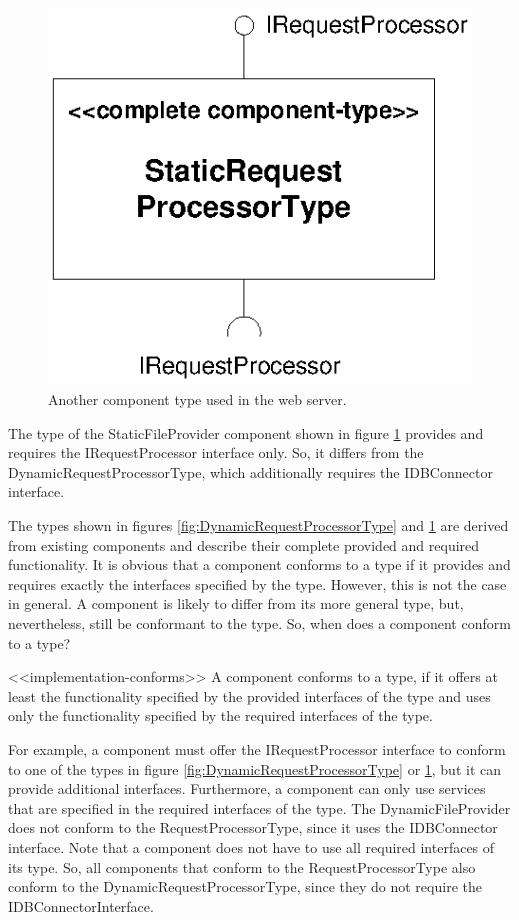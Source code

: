 \begin{figure}[htbp]
\centering
\includegraphics[scale=0.85]{example/RequestProcessorType}
\caption{Another component type used in the web server.}
\label{fig:RequestProcessorType}
\end{figure}

The type of the StaticFileProvider component shown in figure
\ref{fig:RequestProcessorType} provides and requires the IRequestProcessor
interface only. So, it differs from the DynamicRequestProcessorType, which
additionally requires the IDBConnector interface. 

The types shown in figures \ref{fig:DynamicRequestProcessorType} and
\ref{fig:RequestProcessorType} are derived from existing components and describe
their complete provided and required functionality.
It is obvious that a component conforms to a type if it provides and requires
exactly the interfaces specified by the type. However, this is not the case in
general. A component is likely to differ from its more general type, but,
nevertheless, still be conformant to the type. So, when does a component conform
to a type?

<<implementation-conforms>>
A component conforms to a type, if it offers at least the functionality
specified by the provided interfaces of the type and uses only the functionality
specified by the required interfaces of the type.

For example, a component must offer the IRequestProcessor interface to conform
to one of the types in figure \ref{fig:DynamicRequestProcessorType} or
\ref{fig:RequestProcessorType}, but it can provide additional interfaces.
Furthermore, a component can only use services that are specified in the
required interfaces of the type. The DynamicFileProvider does not conform to the
RequestProcessorType, since it uses the IDBConnector interface. Note that a
component does not have to use all required interfaces of its type. So, all
components that conform to the RequestProcessorType also conform to the
DynamicRequestProcessorType, since they do not require the
IDBConnectorInterface. 

